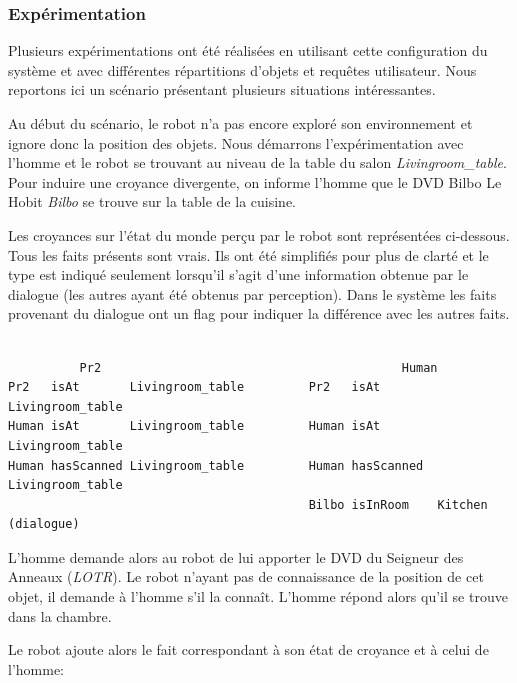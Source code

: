 \documentclass[a4paper,11pt,twoside]{StyleThese}
\begin{document}
\subsubsection{Expérimentation}


Plusieurs expérimentations ont été réalisées en utilisant cette configuration du système et avec différentes répartitions d'objets et requêtes utilisateur. Nous reportons ici un scénario présentant plusieurs situations intéressantes.

Au début du scénario, le robot n'a pas encore exploré son environnement et ignore donc la position des objets.
Nous démarrons l'expérimentation avec l'homme et le robot se trouvant au niveau de  la table du salon \textit{Livingroom\_table}. Pour induire une croyance divergente, on informe l'homme que le DVD Bilbo Le Hobit \textit{Bilbo} se trouve sur la table de la cuisine.

Les croyances sur l'état du monde perçu par le robot sont représentées ci-dessous.
Tous les faits présents sont vrais. Ils ont été simplifiés pour plus de clarté et le type est indiqué seulement lorsqu'il s'agit d'une information obtenue par le dialogue (les autres ayant été obtenus par perception). Dans le système les faits provenant du dialogue ont un flag pour indiquer la différence avec les autres faits.


\begin{scriptsize}
\begin{verbatim}

          Pr2                                          Human
Pr2   isAt       Livingroom_table         Pr2   isAt        Livingroom_table
Human isAt       Livingroom_table         Human isAt        Livingroom_table
Human hasScanned Livingroom_table         Human hasScanned  Livingroom_table
                                          Bilbo isInRoom    Kitchen  (dialogue)

\end{verbatim}
\end{scriptsize}


L'homme demande alors au robot de lui apporter le DVD du Seigneur des Anneaux (\textit{LOTR}).
Le robot n'ayant pas de connaissance de la position de cet objet, il demande à l'homme s'il la connaît.
L'homme répond alors qu'il se trouve dans la chambre.

Le robot ajoute alors le fait correspondant à son état de croyance et à celui de l'homme:
\end{document}
